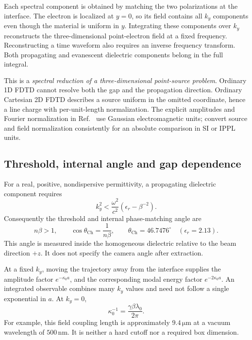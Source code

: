 \documentclass[11pt,a4paper]{article}
\newcommand{\unit}[1]{\,\mathrm{#1}}
\numberwithin{equation}{section}
\begin{document}
Each spectral component is obtained by matching the two polarizations
at the interface. The electron is localized at \(y=0\), so its field
contains all \(k_y\) components even though the material is uniform in
\(y\). Integrating these components over \(k_y\) reconstructs the
three-dimensional point-electron field at a fixed frequency. Reconstructing
a time waveform also requires an inverse frequency transform. Both
propagating and evanescent dielectric components belong in the full integral.

This is a \emph{spectral reduction of a three-dimensional point-source
problem}. Ordinary 1D FDTD cannot resolve both the gap and the propagation
direction. Ordinary Cartesian 2D FDTD describes a source uniform in the
omitted coordinate, hence a line charge with per-unit-length normalization.
The explicit amplitudes and Fourier normalization in
Ref.~\cite{tyukhtin2021invertedprism} use Gaussian electromagnetic units;
convert source and field normalization consistently for an absolute
comparison in SI or IPPL units.

\subsection{Threshold, internal angle and gap dependence}

For a real, positive, nondispersive permittivity, a propagating dielectric
component requires
\begin{equation}
 k_y^2<\frac{\omega^2}{c^2}
       \left(\epsilon_r-\beta^{-2}\right).
\end{equation}
Consequently the threshold and internal phase-matching angle are
\begin{equation}
 n\beta>1,\qquad
 \cos\theta_{\mathrm{Ch}}=\frac{1}{n\beta},\qquad
 \theta_{\mathrm{Ch}}=46.7476^\circ
 \quad(\epsilon_r=2.13).
 \label{eq:angle}
\end{equation}
This angle is measured inside the homogeneous dielectric relative to
the beam direction \(+z\). It does not specify the camera angle after extraction.

At a fixed \(k_y\), moving the trajectory away from the interface supplies
the amplitude factor \(e^{-\kappa_0a}\), and the corresponding modal energy
factor \(e^{-2\kappa_0a}\). An integrated observable combines many \(k_y\)
values and need not follow a single exponential in \(a\). At \(k_y=0\),
\begin{equation}
 \kappa_0^{-1}=\frac{\gamma\beta\lambda_0}{2\pi}.
 \label{eq:coupling}
\end{equation}
For example, this field coupling length is approximately
\(9.4\unit{\mu m}\) at a vacuum wavelength of \(500\unit{nm}\).
It is neither a hard cutoff nor a required box dimension.
\end{document}
